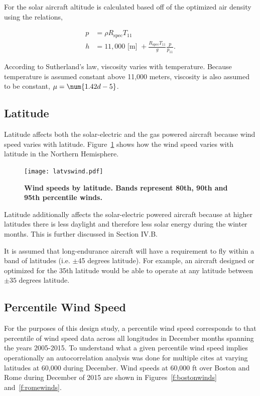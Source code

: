 For the solar aircraft altitude is calculated based off of the optimized air density using the relations,\cite{isaatm} 

\begin{align}
    \label{e:tropopress}
    p &= \rho R_{\text{spec}}T_{11} \\
    \label{e:tropoalt}
    h &= 11,000 \text{ [m] } + \frac{R_{\text{spec}}T_{11}}{g}\frac{p}{p_{11}}.
\end{align}

According to Sutherland's law\cite{fluiddyhandbook}, viscosity varies with temperature.  Because temperature is assumed constant above 11,000 meters\cite{isaatm}, viscosity is also assumed to be constant, $\mu=\num{1.42d-5}$. \\

\subsection{Latitude}

Latitude affects both the solar-electric and the gas powered aircraft because wind speed varies with latitude. 
Figure~\ref{f:latvswind} shows how the wind speed varies with latitude in the Northern Hemisphere. 

\begin{figure}[H]
	\begin{center}
	\texttt{[image: latvswind.pdf]}
    \caption{\textbf{Wind speeds by latitude.  Bands represent 80th, 90th and 95th percentile winds. }}
	\label{f:latvswind}
	\end{center}
\end{figure}

Latitude additionally affects the solar-electric powered aircraft because at higher latitudes there is less daylight and therefore less solar energy during the winter months. This is further discussed in Section IV.B.

It is assumed that long-endurance aircraft will have a requirement to fly within a band of latitudes (i.e. $\pm$45 degrees latitude).  
For example, an aircraft designed or optimized for the 35th latitude would be able to operate at any latitude between $\pm35$ degrees latitude. 

\subsection{Percentile Wind Speed}

For the purposes of this design study, a percentile wind speed corresponds to that percentile of wind speed data across all longitudes in December months spanning the years 2005-2015.  
To understand what a given percentile wind speed implies operationally an autocorrelation analysis was done for multiple cites at varying latitudes at 60,000 during December. 
Wind speeds at 60,000 ft over Boston and Rome during December of 2015 are shown in Figures~\ref{f:bostonwinds} and~\ref{f:romewinds}. 

